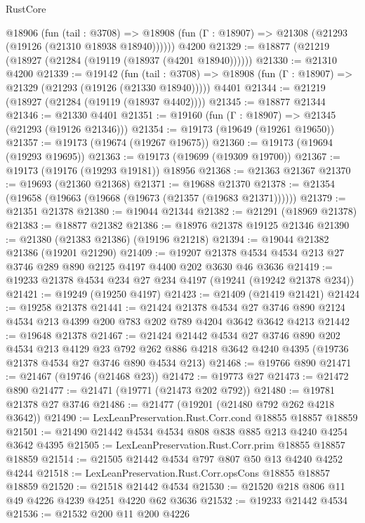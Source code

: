 \begin{lexlean}{RustCore}
\begin{coremodule}
    @18906
      (fun (tail : @3708) =>
      @18908 (fun (Γ : @18907) => @21308 (@21293 (@19126 (@21310 @18938 @18940))))))
    @4200
@21329 := @18877 (@21219 (@18927 (@21284 (@19119 (@18937 (@4201 @18940))))))
@21330 := @21310 @4200
@21339 := @19142
    (fun (tail : @3708) => @18908 (fun (Γ : @18907) => @21329 (@21293 (@19126 (@21330 @18940)))))
    @4401
@21344 := @21219 (@18927 (@21284 (@19119 (@18937 @4402))))
@21345 := @18877 @21344
@21346 := @21330 @4401
@21351 := @19160 (fun (Γ : @18907) => @21345 (@21293 (@19126 @21346)))
@21354 := @19173 (@19649 (@19261 @19650))
@21357 := @19173 (@19674 (@19267 @19675))
@21360 := @19173 (@19694 (@19293 @19695))
@21363 := @19173 (@19699 (@19309 @19700))
@21367 := @19173 (@19176 (@19293 @19181)) @18956
@21368 := @21363 @21367
@21370 := @19693 (@21360 @21368)
@21371 := @19688 @21370
@21378 := @21354 (@19658 (@19663 (@19668 (@19673 (@21357 (@19683 @21371))))))
@21379 := @21351 @21378
@21380 := @19044 @21344
@21382 := @21291 (@18969 @21378)
@21383 := @18877 @21382
@21386 := @18976 @21378 @19125 @21346
@21390 := @21380 (@21383 @21386) (@19196 @21218)
@21394 := @19044 @21382 @21386 (@19201 @21290)
@21409 := @19207 @21378 @4534 @4534 @213 @27 @3746 @289 @890 @2125 @4197 @4400 @202 @3630 @46 @3636
@21419 := @19233 @21378 @4534 @234 @27 @234 @4197 (@19241 (@19242 @21378 @234))
@21421 := @19249 (@19250 @4197)
@21423 := @21409 (@21419 @21421)
@21424 := @19258 @21378
@21441 := @21424
    @21378
    @4534
    @27
    @3746
    @890
    @2124
    @4534
    @213
    @4399
    @200
    @783
    @202
    @789
    @4204
    @3642
    @3642
    @4213
@21442 := @19648 @21378
@21467 := @21424
    @21442
    @4534
    @27
    @3746
    @890
    @202
    @4534
    @213
    @4129
    @23
    @792
    @262
    @886
    @4218
    @3642
    @4240
    @4395
    (@19736 @21378 @4534 @27 @3746 @890 @4534 @213)
@21468 := @19766 @890
@21471 := @21467 (@19746 (@21468 @23))
@21472 := @19773 @27
@21473 := @21472 @890
@21477 := @21471 (@19771 (@21473 @202 @792))
@21480 := @19781 @21378 @27 @3746
@21486 := @21477 (@19201 (@21480 @792 @262 @4218 @3642))
@21490 := LexLeanPreservation.Rust.Corr.cond @18855 @18857 @18859
@21501 := @21490 @21442 @4534 @4534 @808 @838 @885 @213 @4240 @4254 @3642 @4395
@21505 := LexLeanPreservation.Rust.Corr.prim @18855 @18857 @18859
@21514 := @21505 @21442 @4534 @797 @807 @50 @13 @4240 @4252 @4244
@21518 := LexLeanPreservation.Rust.Corr.opsCons @18855 @18857 @18859
@21520 := @21518 @21442 @4534
@21530 := @21520 @218 @806 @11 @49 @4226 @4239 @4251 @4220 @62 @3636
@21532 := @19233 @21442 @4534
@21536 := @21532 @200 @11 @200 @4226

\end{coremodule}
\end{lexlean}

